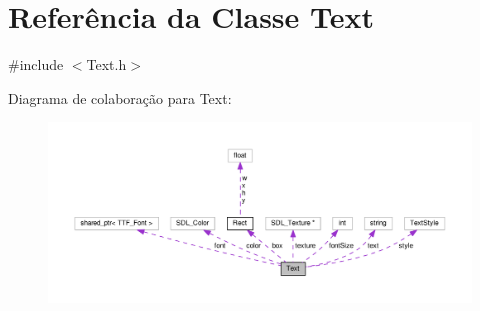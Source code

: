 \hypertarget{classText}{\section{Referência da Classe Text}
\label{classText}
}


{\ttfamily \#include $<$Text.\+h$>$}



Diagrama de colaboração para Text\+:\nopagebreak
\begin{figure}[H]
\begin{center}
\leavevmode
\includegraphics[width=350pt]{classText__coll__graph}
\end{center}
\end{figure}
